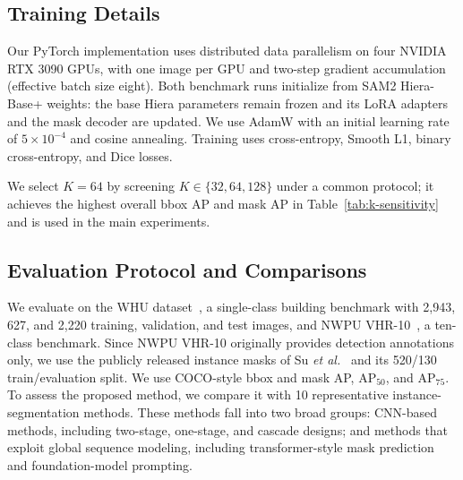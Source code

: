 \documentclass{article}
\begin{document}
\subsection{Training Details}
Our PyTorch implementation uses distributed data parallelism on four NVIDIA
RTX 3090 GPUs, with one image per GPU and two-step gradient accumulation
(effective batch size eight). Both benchmark runs initialize from SAM2
Hiera-Base+ weights: the base Hiera parameters remain frozen and its LoRA
adapters and the mask decoder are updated. 
We use AdamW
with an initial learning rate of $5\times10^{-4}$ and cosine annealing.
Training uses cross-entropy, Smooth L1, binary cross-entropy, and Dice losses.

We select $K=64$ by screening $K\in\{32,64,128\}$ under a common protocol;
it achieves the highest overall bbox AP and mask AP in
Table~\ref{tab:k-sensitivity} and is used in the main experiments.

\begin{table}[t]
\caption{Sensitivity of $K$ on NWPU VHR-10 under a common development protocol. AP (\%).}
\label{tab:k-sensitivity}
\centering
\scriptsize
{}
\end{table}

\subsection{Evaluation Protocol and Comparisons}
We evaluate on the WHU dataset~\cite{whu}, a single-class building benchmark with
2,943, 627, and 2,220 training, validation, and test images, and NWPU VHR-10~\cite{nwpu}, a
ten-class benchmark. Since NWPU VHR-10 originally provides detection annotations
only, we use the publicly released instance masks of Su \textit{et al.}~\cite{nwpu_instance}
and its 520/130 train/evaluation split. We use COCO-style bbox and mask AP, AP$_{50}$, and
AP$_{75}$. To assess the proposed method, we compare it with
10 representative instance-segmentation methods. These
methods fall into two broad groups: CNN-based methods, including two-stage,
one-stage, and cascade designs; and methods that exploit global sequence
modeling, including transformer-style mask prediction and foundation-model
prompting.
\end{document}
